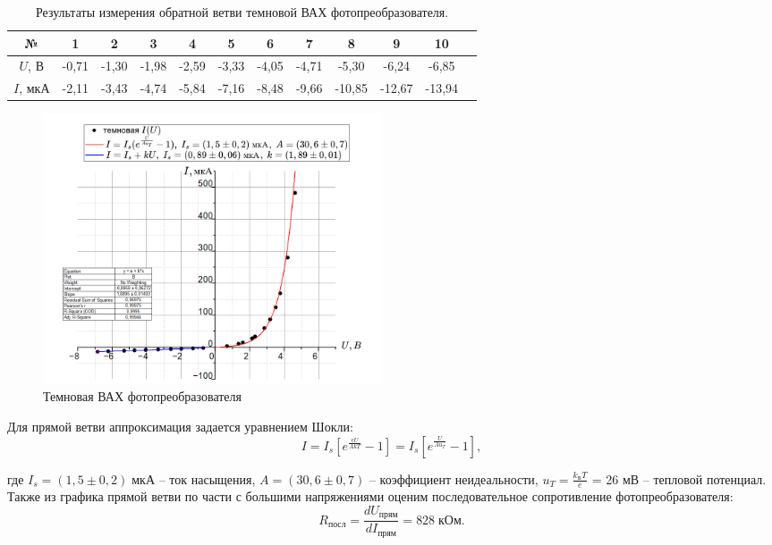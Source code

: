 \documentclass[a4paper, 12pt]{article}
\begin{document}
 \begin{table}[h!]
    \centering
    \begin{tabular}{|c|c|c|c|c|c|c|c|c|c|c|c|}
    \hline
        № & 1 & 2 & 3 & 4 & 5 & 6 & 7 & 8 & 9& 10 \\ \hline
        $U$, В & -0,71 & -1,30 & -1,98 & -2,59 & -3,33 & -4,05 & -4,71 & -5,30 & -6,24 & -6,85 \\ \hline
        $I$, мкА & -2,11 & -3,43 & -4,74 & -5,84 & -7,16 & -8,48 & -9,66 & -10,85 & -12,67 & -13,94 \\ \hline
    \end{tabular}
    \caption{Результаты измерения обратной ветви темновой ВАХ фотопреобразователя.}
    \label{table_dark_forward_VAC}
    \end{table}
\newpage

\begin{figure}[h!]
    \centering %
    \includegraphics[width=10cm,height=8cm]{темновая.png} %
    \caption{Темновая ВАХ фотопреобразователя}\label{fig:sun} %
\end{figure}

Для прямой ветви аппроксимация задается уравнением Шокли:
$$
        I = I_s \left[ e^{ \frac{eU}{AkT}} - 1 \right] = I_s \left[ e^{\frac{U}{Au_T} } - 1 \right], 
        \label{formula_Shokli}
    $$

    где $\boxed{I_s=(1,5\pm0,2) \; \text{мкА}}$ -- ток насыщения, $\boxed{A=(30,6\pm0,7)}$ -- коэффициент неидеальности, $u_T = \frac{k_{Б}T}{e}$ = 26 мВ -- тепловой потенциал. Также из графика прямой ветви по части с большими напряжениями оценим последовательное сопротивление фотопреобразователя:
$$   
\boxed{R_{\text{посл}} = \frac{dU_{\text{прям}}}{dI_{\text{прям}}} = 828 \; \text{кОм}}.
$$
\end{document}
